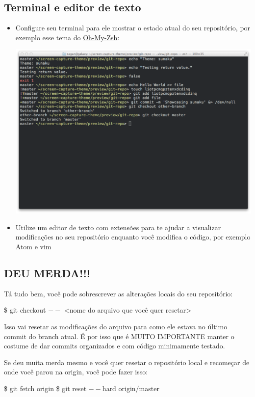 \documentclass[12pt]{article}
\begin{document}
\begin{doublespacing}
\subsection{Terminal e editor de texto}
\begin{itemize}
\item Configure seu terminal para ele mostrar o estado atual do seu repositório, por exemplo esse tema do \href{https://github.com/robbyrussell/oh-my-zsh/}{Oh-My-Zsh}:
\begin{center}
\includegraphics[scale=0.4]{sunaku.png}

\end{center}
\item Utilize um editor de texto com extensões para te ajudar a visualizar modificações no seu repositório enquanto você modifica o código, por exemplo Atom e vim

\end{itemize}

\subsection{DEU MERDA!!!} 

Tá tudo bem, você pode sobrescrever as alterações locais do seu repositório:
\begin{flushleft}
		\$ git checkout $--$ <nome do arquivo que você quer resetar>
\end{flushleft}
Isso vai resetar as modificações do arquivo para como ele estava no último commit do branch atual. É por isso que é MUITO IMPORTANTE manter o costume de dar commits organizados e com código minimamente testado.
 
Se deu muita merda mesmo e você quer resetar o repositório local e recomeçar de onde você parou na origin, você pode fazer isso: 
\begin{flushleft}
\$ git fetch origin \newline
\$ git reset $--$hard origin/master
\end{flushleft}


\end{doublespacing}
\end{document}
